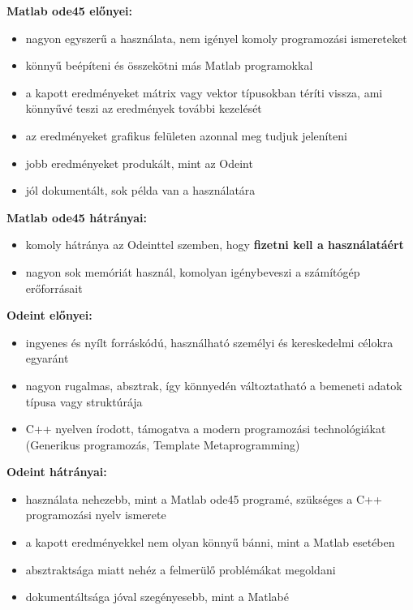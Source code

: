 \textbf{Matlab ode45 előnyei:}
\begin{itemize}
	\item nagyon egyszerű a használata, nem igényel komoly programozási ismereteket
	\item könnyű beépíteni és összekötni más Matlab programokkal
	\item a kapott eredményeket mátrix vagy vektor típusokban téríti vissza, ami könnyűvé teszi az eredmények további kezelését
	\item az eredményeket grafikus felületen azonnal meg tudjuk jeleníteni
	\item jobb eredményeket produkált, mint az Odeint
	\item jól dokumentált, sok példa van a használatára
\end{itemize}
\pagebreak
\textbf{Matlab ode45 hátrányai:}
\begin{itemize}
	\item komoly hátránya az Odeinttel szemben, hogy \textbf{fizetni kell a használatáért}
	\item nagyon sok memóriát használ, komolyan igénybeveszi a számítógép erőforrásait
\end{itemize}
\textbf{Odeint előnyei:}
\begin{itemize}
	\item ingyenes és nyílt forráskódú, használható személyi és kereskedelmi célokra egyaránt
	\item nagyon rugalmas, absztrak, így könnyedén változtatható a bemeneti adatok típusa vagy struktúrája 
	\item C++ nyelven írodott, támogatva a modern programozási technológiákat (Generikus programozás, Template Metaprogramming)
\end{itemize}
\textbf{Odeint hátrányai:}
\begin{itemize}
	\item használata nehezebb, mint a Matlab ode45 programé, szükséges a C++ programozási nyelv ismerete
	\item a kapott eredményekkel nem olyan könnyű bánni, mint a Matlab esetében
	\item absztraktsága miatt nehéz a felmerülő problémákat megoldani
	\item dokumentáltsága jóval szegényesebb, mint a Matlabé
\end{itemize}




